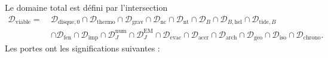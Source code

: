 \documentclass[11pt,a4paper,openany]{report}
\begin{document}
Le domaine total est défini par l'intersection
\begin{equation}
\boxed{\begin{aligned}
\mathcal{D}_{\mathrm{viable}}=\ &\mathcal{D}_{\mathrm{disque},0}\cap\mathcal{D}_{\mathrm{thermo}}
\cap\mathcal{D}_{\mathrm{grav}}\cap\mathcal{D}_{\mathrm{nc}}\cap\mathcal{D}_{\mathrm{nt}}
\cap\mathcal{D}_{B}\cap\mathcal{D}_{B,\mathrm{hel}}\cap\mathcal{D}_{\mathrm{tide},B}\\
&\cap\mathcal{D}_{\mathrm{fen}}\cap\mathcal{D}_{\mathrm{imp}}
\cap\mathcal{D}_{J}^{\mathrm{num}}\cap\mathcal{D}_{J}^{\mathrm{EM}}\cap\mathcal{D}_{\mathrm{evac}}
\cap\mathcal{D}_{\mathrm{accr}}\cap\mathcal{D}_{\mathrm{arch}}
\cap\mathcal{D}_{\mathrm{geo}}\cap\mathcal{D}_{\mathrm{iso}}\cap\mathcal{D}_{\mathrm{chrono}}.
\end{aligned}}
\label{eq:Dviable}
\end{equation}
Les portes ont les significations suivantes :
\end{document}
